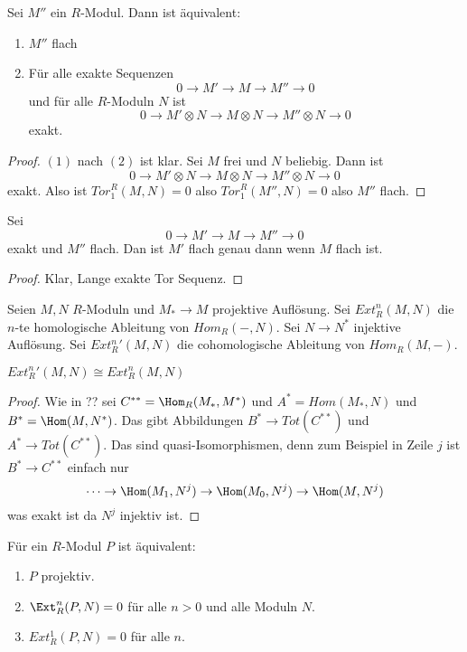 \begin{Satz} Sei \(M''\) ein \(R\)-Modul. Dann ist äquivalent:
	\begin{enumerate}
		\item \(M''\) flach
		\item Für alle exakte Sequenzen \[0\to M'\to M\to M''\to 0\] und für alle \(R\)-Moduln \(N\) ist 
		\[0\to M'\otimes N\to M\otimes N\to M''\otimes N\to 0\] exakt.
	\end{enumerate}
	
\end{Satz}
\begin{proof}
	\((1)\) nach \((2)\) ist klar. Sei \(M\) frei und \(N\) beliebig.
	Dann ist \[0\to M'\otimes N\to M\otimes N\to M''\otimes N\to 0\] exakt.
	Also ist \(Tor_1^R(M,N)=0\) also \(Tor_1^R(M'',N)=0\) also \(M''\) flach.
\end{proof}
\begin{Satz} Sei \[0\to M'\to M\to M''\to 0\] exakt und \(M''\) flach.
	Dan ist \(M'\) flach genau dann wenn \(M\) flach ist.
	
\end{Satz}
\begin{proof}
	Klar, Lange exakte Tor Sequenz.
\end{proof}
\begin{Def} Seien \(M,N\) \(R\)-Moduln und \(M_*\to M\) projektive Auflösung.
	Sei \(Ext_R^n(M,N)\) die \(n\)-te homologische Ableitung von \(Hom_R(-,N)\). 
	Sei  \(N\to N^*\) injektive Auflösung. Sei \(Ext_R^n'(M,N)\) die cohomologische Ableitung von \(Hom_R(M,-)\). 
	
\end{Def}
\begin{Satz} \(Ext_R^n'(M,N)\cong Ext_R^n(M,N)\)
	
\end{Satz}
\begin{proof}
	Wie in ?? sei \(C^{**}=\Hom_R(M_*,M^*)\) und \(A^*=Hom(M_*,N)\) und \(B^*=\Hom(M,N^*)\).
	Das gibt Abbildungen \(B^*\to Tot(C^{**})\) und \(A^*\to Tot(C^{**})\). Das sind quasi-Isomorphismen, denn zum
	Beispiel in Zeile \(j\) ist \(B^*\to C^{**}\) einfach nur 
	\[\dots\to\Hom(M_1,N^j)\to\Hom(M_0,N^j)\to\Hom(M,N^j)\] was exakt ist da \(N^j\) injektiv ist.
\end{proof}
\begin{Satz} Für ein \(R\)-Modul \(P\) ist äquivalent:
	\begin{enumerate}
		\item \(P\) projektiv.
		\item \(\Ext_R^n(P,N)=0\) für alle \(n>0\) und alle Moduln \(N\).
		\item \(Ext_R^1(P,N)=0\) für alle \(n\).
	\end{enumerate}
	
\end{Satz}
